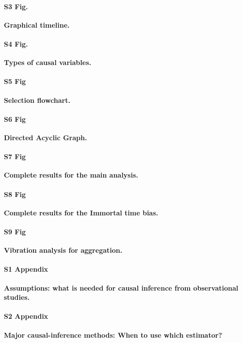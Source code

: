 \documentclass[10pt,letterpaper]{article}
\begin{document}
\paragraph*{S3 Fig.}
\label{apd:graphical_timeline}
{\bf Graphical timeline.}

\paragraph*{S4 Fig.}
\label{apd:causal_variables}
{\bf Types of causal variables.}

\paragraph*{S5 Fig}
\label{apd:selection_flowchart}
{\bf Selection flowchart.}

\paragraph*{S6 Fig}
\label{apd:causal_diagram_albumin}
{\bf Directed Acyclic Graph.}

\paragraph*{S7 Fig}
\label{apd:detailed_results}
{\bf Complete results for the main analysis.}

\paragraph*{S8 Fig}
\label{apd:detailed_results_itb}
{\bf Complete results for the Immortal time bias.}

\paragraph*{S9 Fig}
\label{apd:vibration_analysis_for_aggregation}
{\bf Vibration analysis for aggregation.}

\paragraph*{S1 Appendix}
\label{apd:causal_assumptions}
{\bf Assumptions: what is needed for causal inference from observational studies.}

\paragraph*{S2 Appendix}
\label{apd:causal_estimators}
{\bf Major causal-inference methods: When to use which estimator?}
\end{document}

